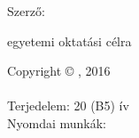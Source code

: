 \vspace*{\fill}

{
\centering
Szerző:\\\textbf{}
	
\vspace*{\fill}

egyetemi oktatási célra

\vspace*{\fill}

Copyright © , 2016
\\
\\

Terjedelem: 20 (B5) ív\\
Nyomdai munkák:\\


}

\vspace*{\fill}%
